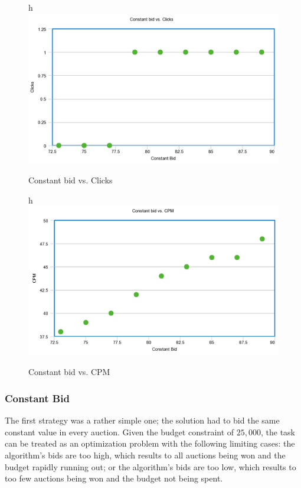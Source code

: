 \documentclass{sig-alternate-05-2015}
\begin{document}
\begin{figure}{h}
  \includegraphics[width=\linewidth]{click.png}
  \caption{Constant bid vs. Clicks}
  \label{fig:clicks}
\end{figure}

\begin{figure}{h}
  \includegraphics[width=\linewidth]{CPM.png}
  \caption{Constant bid vs. CPM}
  \label{fig:CPM}
\end{figure}

\subsubsection{Constant Bid}
The first strategy was a rather simple one; the solution had to bid the same constant value in every auction. Given the budget constraint of $25,000$, the task can be treated as an optimization problem with the following limiting cases: the algorithm's bids are too high, which results to all auctions being won and the budget rapidly running out; or the algorithm's bids are too low, which results to too few auctions being won and the budget not being spent. 
\end{document}
